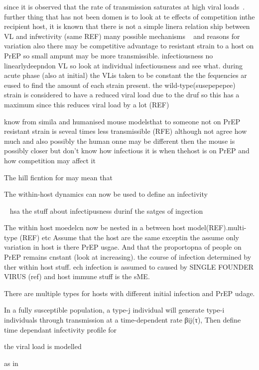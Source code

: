 \documentclass[DIV=15]{scrartcl}
\begin{document}
since it is observed that the rate of transmission saturates at high viral loads~\cite{fraser2007}.  further thing that has not been domen is to look at te effects of competition inthe recipient host, it is known that there is not a simple linera relation ship between VL and infwctivity (same REF) 
many possible mechanisms ~\cite{fraser2014,gupta2006,wagner2012,joseph2015} and reasons for variation also there may be competitive advantage to resistant strain to  a host on PrEP  so small ampunt may be more transmissible.
infectiousness no linearlydeepndon VL   so look at individual infectiousness and see what. during acute phase (also  at initial) the VLis taken to be constant the the fequencies ar eused to find the amount of each strain present. the wild-type(susepepepee)  strain is considered  to have a reduced viral load due to the druf so this has a maximum since this reduces viral load by a lot (REF)

know from simila and humanised mouse modelsthat to someone not on PrEP resistant strain is seveal times less transmissible (RFE) although not agree how much and also  possibly the human onne may be different then the mouse is possibly closer but don't know how infectious it is when thehost is on PrEP and how competition may affect it 

 The hill ficntion for may mean that   
  
  
The within-host dynamics can now be used to define an infectivity 

~\cite{hollingsworth2008} hsa the stuff about infectipusness durinf the satges of ingection


The  within host moedelcn now be nested  in a between host model(REF).multi-type (REF) etc  Assume that the host are the same exceptin the
assume only variation in host is there PrEP  usgae. And that the proportopna of people on PrEP  remains cnstant (look at increasing). the course of  infection determined by  ther within host stuff.  ech infection  is assumed to caused by  SINGLE  FOUNDER VIRUS (ref) and host immune stuff is  the sME. 


There are multiple types  for hosts with different initial  infection and PrEP udage.

In a fully susceptible population, a type-j
individual will generate type-i individuals through transmission
at a time-dependent rate βij(τ),
 Then define time dependant infectivity profile for 


the viral load is modelled 

as in 
\end{document}

